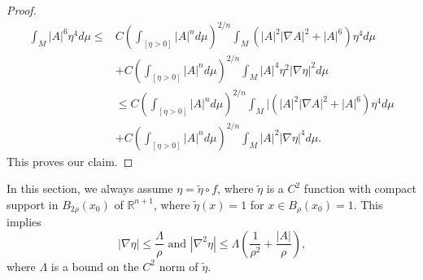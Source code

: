 \documentclass{amsart}
\theoremstyle{definition}
\numberwithin{equation}{section}
\begin{document}
\begin{proof}
\begin{align}
    \int_{M}|A|^{6} \eta^4 d\mu
    \leq & C \left ( \int_{[\eta >0] } \left| A \right|^{n} d\mu \right)^{2/n}\int_{M} (|A|^2 |\nabla   A|^2+|A|^6)
     \eta^4 d\mu  \\
    &+ C \left ( \int_{[\eta >0]}  \left| A \right|^{n} d\mu \right )^{2/n} \int_{M} | A|^{4} \eta^2 |\nabla \eta|^2  d\mu\nonumber\\
    &\leq   C\left ( \int_{[\eta >0]} \left| A \right|^{n} d\mu \right )^{2/n}
        \int_{M}   |   (|A|^2 |\nabla   A|^2+|A|^6)  \eta^4  d\mu\nonumber
        \\
       & + C \left ( \int_{[\eta >0]} \left|A \right|^{n} d\mu \right )^{2/n} \int_{M}|A|^{2}|\nabla \eta|^4
       d\mu\nonumber.
\end{align}
This proves our claim.
\end{proof}
In this section,  we always assume $\eta = \tilde \eta \circ f$, where $\tilde
\eta$ is a $C^{2}$ function with compact support in $B_{2\rho}(x_0)$  of $\mathbb{R}^{n+1}$, where $\tilde \eta (x) =1$ for  $x\in
B_{\rho}(x_0)=1$.  This implies
$$\left| \nabla \eta\right| \leq \frac {\Lambda}{\rho} \mbox{ and } \left| \nabla^{2} \eta \right| \leq \Lambda \left(\frac 1 {\rho^2}+\frac {
\left| A \right|}{\rho}
\right)
\mbox{,}$$
where $\Lambda$ is a bound on the $C^{2}$ norm of $\tilde \eta$.
\end{document}
